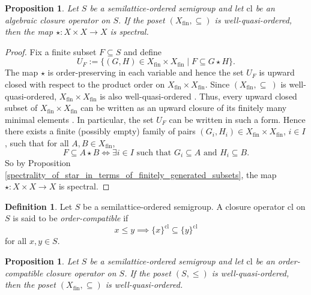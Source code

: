 \documentclass[10pt, reqno]{amsart}
\theoremstyle{plain}
\newtheorem{prop}[theorem]{Proposition}
\theoremstyle{definition}
\newtheorem{definition}[theorem]{Definition}
\begin{document}
\begin{prop}\label{well_quasi_order_implies_spectrality}
    Let $S$ be a semilattice-ordered semigroup and let $\mathrm{cl}$ be an algebraic closure operator on $S$. If the poset $(X_\mathrm{fin}, \subseteq)$ is well-quasi-ordered, then the map $\star : X \times X \rightarrow X$ is spectral. 
\end{prop}
\begin{proof}
    Fix a finite subset $F \subseteq S$ and define 
    \begin{equation*}
        U_F := \{(G, H)\in X_\mathrm{fin} \times X_\mathrm{fin} \mid F \subseteq G \star H\}. 
    \end{equation*}
    The map $\star$ is order-preserving in each variable and hence the set $U_F$ is upward closed with respect to the product order on $X_\mathrm{fin} \times X_\mathrm{fin}$. Since $(X_\mathrm{fin}, \subseteq~)$ is well-quasi-ordered, $X_\mathrm{fin} \times X_\mathrm{fin}$ is also well-quasi-ordered \cite[Lemma 1.8]{schmitz}. Thus, every upward closed subset of $X_\mathrm{fin} \times X_\mathrm{fin}$ can be written as an upward closure of its finitely many minimal elements \cite[Lemma 1.7]{schmitz}. In particular, the set $U_F$ can be written in such a form. Hence there exists a finite (possibly empty) family of pairs $(G_i, H_i) \in X_\mathrm{fin} \times X_\mathrm{fin}$, $i \in I$, such that for all $A, B\in X_\mathrm{fin}$, 
    \begin{equation*}
        F \subseteq A\star B \iff \exists i\in I \text{ such that } G_i \subseteq A \text{ and } H_i \subseteq B. 
    \end{equation*}
    So by Proposition \ref{spectrality_of_star_in_terms_of_finitely_generated_subsets}, the map $\star : X \times X \rightarrow X$ is spectral. 
\end{proof}
\begin{definition}
    Let $S$ be a semilattice-ordered semigroup. A closure operator $\mathrm{cl}$ on $S$ is said to be \emph{order-compatible} if $$x \leqslant y \implies \{x\}^\mathrm{cl} \subseteq \{y\}^\mathrm{cl}$$ for all $x, y \in S$. 
\end{definition}
\begin{prop}
    Let $S$ be a semilattice-ordered semigroup and let $\mathrm{cl}$ be an order-compatible closure operator on $S$. If the poset $(S, \leqslant)$ is well-quasi-ordered, then the poset $(X_\mathrm{fin}, \subseteq)$ is well-quasi-ordered. 
\end{prop}
\end{document}

